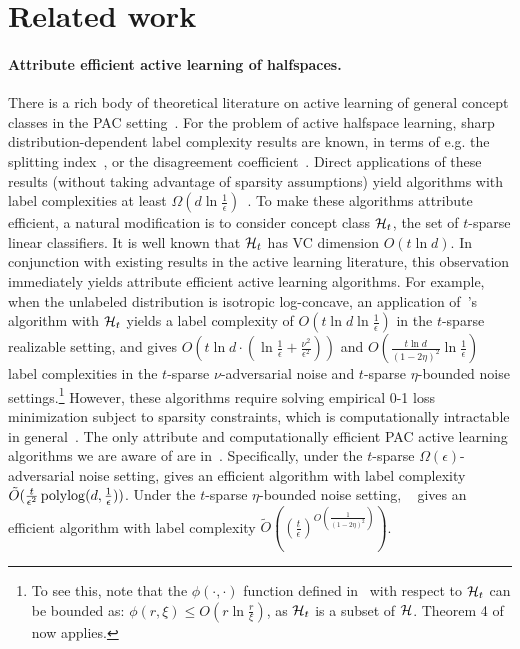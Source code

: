 \section{Related work}

\paragraph{Attribute efficient active learning of halfspaces.}
There is a rich body of theoretical literature on active learning of general concept classes
in the PAC setting~\citep{D11, H14}. For the problem of active halfspace learning, sharp distribution-dependent label complexity results are known,
in terms of e.g. the splitting index~\citep{D05}, or the disagreement coefficient~\citep{H07}.
Direct applications of these results (without taking advantage of sparsity assumptions)
yield algorithms with label complexities at least $\Omega(d \ln \frac 1 \epsilon)$~\citep{KMT93}.
To make these algorithms attribute efficient, a natural modification is to consider concept class
$\mathcal{H}_t$, the set of $t$-sparse linear classifiers.
It is well known that $\mathcal{H}_t$ has VC dimension
$O(t \ln d)$. In conjunction with existing results in the active learning
literature, this observation immediately yields attribute efficient active
learning algorithms. For example, when the unlabeled distribution is isotropic log-concave,
an application of~\cite{ZC14}'s algorithm with $\mathcal{H}_t$ yields a label complexity
of $O(t \ln d \ln \frac 1 \epsilon)$ in the $t$-sparse realizable setting, and gives
$O(t \ln d \cdot (\ln \frac 1 \epsilon+\frac{\nu^2}{\epsilon^2}))$ and
$O(\frac{t\ln d}{(1-2\eta)^2} \ln \frac 1 \epsilon)$
label complexities in the $t$-sparse $\nu$-adversarial noise and $t$-sparse $\eta$-bounded noise settings.\footnote{To see this, note that the $\phi(\cdot,\cdot)$ function
defined in~\cite{ZC14} with respect to $\mathcal{H}_t$ can be bounded as: $\phi(r,\xi) \leq O(r \ln \frac{r}{\xi})$, as $\mathcal{H}_t$ is a subset of $\mathcal{H}$. Theorem 4 of \cite{ZC14} now applies.}
However, these algorithms require solving
empirical 0-1 loss minimization subject to sparsity constraints, which is computationally intractable in general~\citep{N95}.
The only attribute and computationally efficient PAC active learning algorithms we are aware of are in~\cite{ABHZ16}.  Specifically, under the $t$-sparse $\Omega(\epsilon)$-adversarial noise setting, \cite{ABHZ16} gives an efficient algorithm with label complexity $\tilde{O}(\frac{t}{\epsilon^2}\operatorname{polylog}(d,\frac 1 \epsilon))$. Under the $t$-sparse $\eta$-bounded noise setting, ~\cite{ABHZ16} gives an efficient algorithm with label complexity $\tilde{O}((\frac t \epsilon)^{O(\frac 1 {(1-2\eta)^2})})$.


